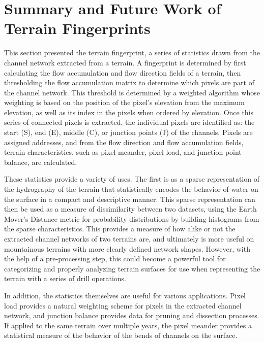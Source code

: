 \section{Summary and Future Work of Terrain Fingerprints}

This section presented the terrain fingerprint, a series of statistics drawn from the channel network extracted from a terrain. A fingerprint is determined by first calculating the flow accumulation and flow direction fields of a terrain, then thresholding the flow accumulation matrix to determine which pixels are part of the channel network. This threshold is determined by a weighted algorithm whose weighting is based on the position of the pixel's elevation from the maximum elevation, as well as its index in the pixels when ordered by elevation. Once this series of connected pixels is extracted, the individual pixels are identified as: the start (S), end (E), middle (C), or junction points (J) of the channels. Pixels are assigned addresses, and from the flow direction and flow accumulation fields, terrain characteristics, such as pixel meander, pixel load, and junction point balance, are calculated.

These statistics provide a variety of uses. The first is as a sparse representation of the hydrography of the terrain that statistically encodes the behavior of water on the surface in a compact and descriptive manner. This sparse representation can then be used as a measure of dissimilarity between two datasets, using the Earth Mover's Distance metric for probability distributions by building histograms from the sparse characteristics. 
This provides a measure of how alike or not the extracted channel networks of two terrains are, and ultimately is more useful on mountainous terrains with more clearly defined network shapes. However, with the help of a pre-processing step, this could become a powerful tool for categorizing and properly analyzing terrain surfaces for use when representing the terrain with a series of drill operations.

In addition, the statistics themselves are useful for various applications. Pixel load provides a natural weighting scheme for pixels in the extracted channel network, and junction balance provides data for pruning and dissection processes. If applied to the same terrain over multiple years, the pixel meander provides a statistical measure of the behavior of the bends of channels on the surface.

